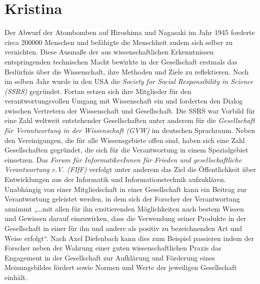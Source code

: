\documentclass{pmwk}
\begin{document}
\section*{Kristina}
Der Abwurf der Atombomben auf Hiroshima und Nagasaki im Jahr 1945 forderte circa 200000 Menschen und befähigte die Menschheit zudem sich selber zu vernichten. Diese Ausmaße der aus wissenschaftlichen Erkenntnissen entspringenden technischen Macht bewirkte in der Gesellschaft erstmals das Bedürfnis über die Wissenschaft, ihre Methoden und Ziele zu reflektieren. Noch im selben Jahr wurde in den USA die \textit{Society for Social Responsibility in Science (SSRS)} gegründet. Fortan setzen sich ihre Mitglieder für den verantwortungsvollen Umgang mit Wissenschaft ein und forderten den Dialog zwischen Vertretern der Wissenschaft und Gesellschaft. Die SSRS war Vorbild für eine Zahl weltweit entstehender Gesellschaften unter anderem für die \textit{Gesellschaft für Verantwortung in der Wissenschaft (GVW)} im deutschen Sprachraum. Neben den Vereinigungen, die für alle Wissensgebiete offen sind, haben sich eine Zahl Gesellschaften gegründet, die sich für die Verantwortung in einem Spezialgebiet einsetzen. Das \textit{Forum für InformatikerInnen für Frieden und gesellschaftliche Verantwortung e.V. (FIfF)} verfolgt unter anderem das Ziel die Öffentlichkeit über Entwicklungen aus der Informatik und Informationstechnik aufzuklären.
Unabhängig von einer Mitgliedschaft in einer Gesellschaft kann ein Beitrag zur Verantwortung geleistet werden, in dem sich der Forscher der Verantwortung annimmt „…mit allen für ihn exsitierenden Möglichkeiten nach bestem Wissen und Gewissen darauf einzuwirken, dass die Verwendung seiner Produkte in der Gesellschaft in einer für ihn und andere als positiv zu bezeichnenden Art und Weise erfolgt“. Nach Axel Diefenbach kann dies zum Beispiel passieren indem der Forscher neben der Wahrung einer guten wissenschaftlichen Praxis das Engagement in der Gesellschaft zur Aufklärung und Förderung eines Meinungsbildes fördert sowie Normen und Werte der jeweiligen Gesellschaft einhält.



\end{document}
